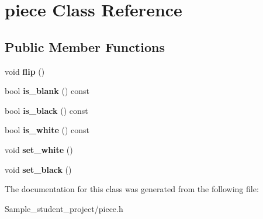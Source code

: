 \hypertarget{classpiece}{}\section{piece Class Reference}
\label{classpiece}
\subsection*{Public Member Functions}
\begin{DoxyCompactItemize}
\item 
\mbox{\label{classpiece_ab898c5827a5859e4cddc9d61a814a873}} 
void {\bfseries flip} ()
\item 
\mbox{\label{classpiece_aa1eda7729e0f3383a813fc6ccc4e7e3c}} 
bool {\bfseries is\+\_\+blank} () const
\item 
\mbox{\label{classpiece_a103dccd216cb495d1c42b2465778be53}} 
bool {\bfseries is\+\_\+black} () const
\item 
\mbox{\label{classpiece_ae9dde29687fcb2b7badc6cb5395a13f2}} 
bool {\bfseries is\+\_\+white} () const
\item 
\mbox{\label{classpiece_a31480899f2a591fdb22d97933303e19d}} 
void {\bfseries set\+\_\+white} ()
\item 
\mbox{\label{classpiece_a273d63d07b6ea973b2fc4f7e1b56ea10}} 
void {\bfseries set\+\_\+black} ()
\end{DoxyCompactItemize}


The documentation for this class was generated from the following file\+:\begin{DoxyCompactItemize}
\item 
Sample\+\_\+student\+\_\+project/piece.\+h\end{DoxyCompactItemize}

